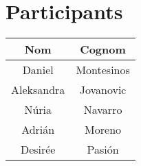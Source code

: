 \section{Participants}

\begin{center}
\begin{tabular}{|c|c|}
\hline
{\cellcolor[gray]{.8} \bf Nom} & {\cellcolor[gray]{.8} \bf Cognom}  \\
\hline
Daniel & Montesinos \\
\hline

Aleksandra & Jovanovic \\
\hline

Núria & Navarro \\
\hline

Adrián & Moreno \\
\hline

Desirée & Pasión \\
\hline
\end{tabular}
\end{center}
